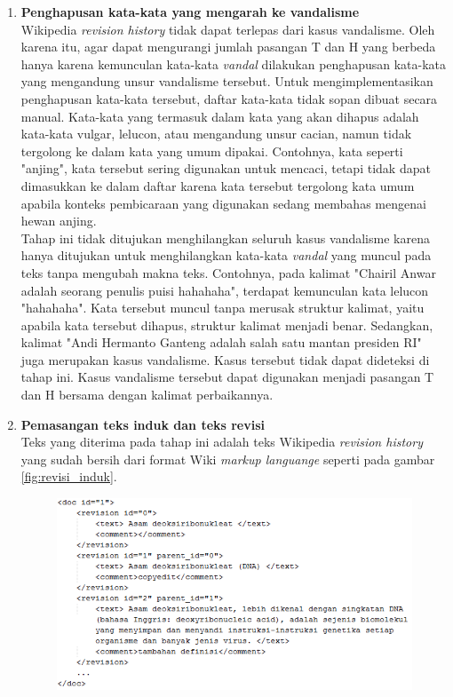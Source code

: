 \begin{enumerate}
	\item \textbf{Penghapusan kata-kata yang mengarah ke vandalisme} \\
	Wikipedia \textit{revision history} tidak dapat terlepas dari kasus vandalisme. Oleh karena itu, agar dapat mengurangi jumlah pasangan T dan H yang berbeda hanya karena kemunculan kata-kata \textit{vandal} dilakukan penghapusan kata-kata yang mengandung unsur vandalisme tersebut. Untuk mengimplementasikan penghapusan kata-kata tersebut, daftar kata-kata tidak sopan dibuat secara manual. Kata-kata yang termasuk dalam kata yang akan dihapus adalah kata-kata vulgar, lelucon, atau mengandung unsur cacian, namun tidak tergolong ke dalam kata yang umum dipakai. Contohnya, kata seperti "anjing", kata tersebut sering digunakan untuk mencaci, tetapi tidak dapat dimasukkan ke dalam daftar karena kata tersebut tergolong kata umum apabila konteks pembicaraan yang digunakan sedang membahas mengenai hewan anjing.\\
	Tahap ini tidak ditujukan menghilangkan seluruh kasus vandalisme karena hanya ditujukan untuk menghilangkan kata-kata \textit{vandal} yang muncul pada teks tanpa mengubah makna teks. Contohnya, pada kalimat "Chairil Anwar adalah seorang penulis puisi hahahaha", terdapat kemunculan kata lelucon "hahahaha". Kata tersebut muncul tanpa merusak struktur kalimat, yaitu apabila kata tersebut dihapus, struktur kalimat menjadi benar. Sedangkan, kalimat "Andi Hermanto Ganteng adalah salah satu mantan presiden RI" juga merupakan kasus vandalisme. Kasus tersebut tidak dapat dideteksi di tahap ini. Kasus vandalisme tersebut dapat digunakan menjadi pasangan T dan H bersama dengan kalimat perbaikannya.
	\item \textbf{Pemasangan teks induk dan teks revisi}\\ 
	Teks yang diterima pada tahap ini adalah teks Wikipedia \textit{revision history} yang sudah bersih dari format Wiki \textit{markup languange} seperti pada gambar \ref{fig:revisi_induk}. 
	\begin{figure}
		\centering
		\includegraphics[width=0.85\linewidth]{pics/revisi_induk}

\end{figure}
\end{enumerate}
